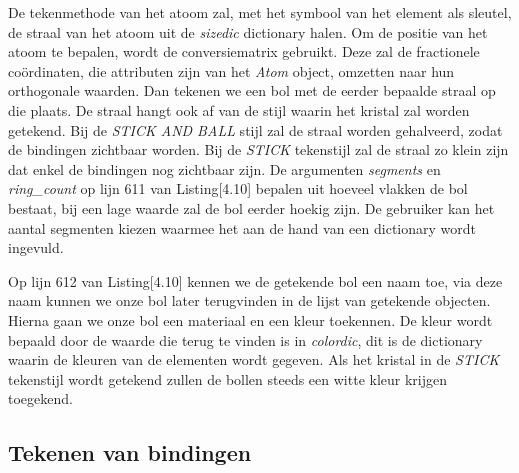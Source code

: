 De tekenmethode van het atoom zal, met het symbool van het element als sleutel, de straal van het atoom uit de \textit{sizedic} dictionary halen. Om de positie van het atoom te bepalen, wordt de conversiematrix gebruikt. Deze zal de fractionele coördinaten, die attributen zijn van het \textit{Atom} object, omzetten naar hun orthogonale waarden. Dan tekenen we een bol met de eerder bepaalde straal op die plaats. De straal hangt ook af van de stijl waarin het kristal zal worden getekend. Bij de \textit{STICK AND BALL} stijl zal de straal worden gehalveerd, zodat de bindingen zichtbaar worden. Bij de \textit{STICK} tekenstijl zal de straal zo klein zijn dat enkel de bindingen nog zichtbaar zijn. De argumenten \textit{segments} en \textit{ring\_count} op lijn 611 van Listing[4.10] bepalen uit hoeveel vlakken de bol bestaat, bij een lage waarde zal de bol eerder hoekig zijn. De gebruiker kan het aantal segmenten kiezen waarmee het aan de hand van een dictionary wordt ingevuld.
\par
Op lijn 612 van Listing[4.10] kennen we de getekende bol een naam toe, via deze naam kunnen we onze bol later terugvinden in de lijst van getekende objecten. Hierna gaan we onze bol een materiaal en een kleur toekennen. De kleur wordt bepaald door de waarde die terug te vinden is in \textit{colordic}, dit is de dictionary waarin de kleuren van de elementen wordt gegeven. Als het kristal in de \textit{STICK} tekenstijl wordt getekend zullen de bollen steeds een witte kleur krijgen toegekend.
\par

\subsection{Tekenen van bindingen}    

